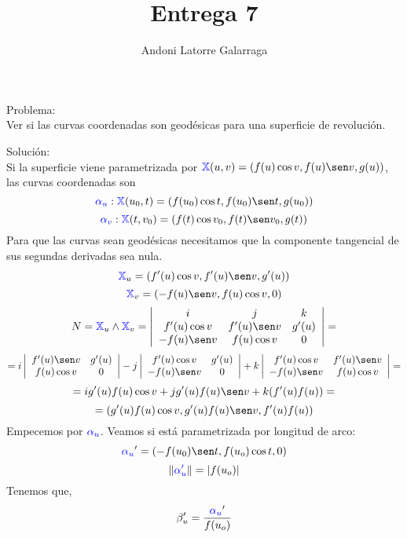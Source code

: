 \documentclass{article}
\title{Entrega 7}
\author{Andoni Latorre Galarraga}
\date{}
\newcommand{\bb}[1]{\mathbb{#1}}
\begin{document}
\maketitle

\textcolor{WildStrawberry}{Problema:}\\
Ver si las curvas coordenadas son geodésicas para una superficie de revolución.

\textcolor{WildStrawberry}{Solución:}\\
Si la superficie viene parametrizada por $\textcolor{blue}{\bb{X}}(u,v)=(f(u)\cos v, f(u)\sen v, g(u))$, las curvas coordenadas son
$$
\textcolor{blue}{\alpha_u} : \textcolor{blue}{\bb{X}}(u_0, t) = (f(u_0)\cos t, f(u_0)\sen t, g(u_0))
$$
$$
\textcolor{blue}{\alpha_v} : \textcolor{blue}{\bb{X}}(t, v_0) = (f(t)\cos v_0, f(t)\sen v_0, g(t))
$$
Para que las curvas sean geodésicas necesitamos que la componente tangencial de sus segundas derivadas sea nula.
$$
\textcolor{blue}{\bb{X}}_u = (f'(u) \cos v, f'(u) \sen v, g'(u))
$$
$$
\textcolor{blue}{\bb{X}}_v = (-f(u)\sen v, f(u)\cos v, 0)
$$
$$
N = \textcolor{blue}{\bb{X}}_u \land \textcolor{blue}{\bb{X}}_v =
\left|\begin{array}{ccc}
    i & j & k \\
    f'(u) \cos v & f'(u) \sen v & g'(u) \\
    -f(u)\sen v & f(u)\cos v & 0
\end{array}\right|=
$$
$$
=i
\left|\begin{array}{cc}
    f'(u)\sen v & g'(u) \\
    f(u)\cos v & 0 \\
\end{array}\right|
- j
\left|\begin{array}{cc}
    f'(u)\cos v & g'(u) \\
    -f(u)\sen v & 0 \\
\end{array}\right|
+ k
\left|\begin{array}{cc}
    f'(u)\cos v & f'(u)\sen v \\
    -f(u)\sen v & f(u)\cos v \\
\end{array}\right| =
$$
$$
=i g'(u)f(u)\cos v + j g'(u)f(u)\sen v + k (f'(u)f(u))=
$$
$$
=(g'(u)f(u) \cos v, g'(u)f(u)\sen v, f'(u)f(u))
$$
Empecemos por $\textcolor{blue}{\alpha_u}$. Veamos si está parametrizada por longitud de arco:
$$
\textcolor{blue}{\alpha_u}' = (-f(u_0) \sen t, f(u_o) \cos t, 0)
$$
$$
\| \textcolor{blue}{\alpha_u'} \| = |f(u_o)|
$$
Tenemos que,
$$
\beta_u' = \frac{\textcolor{blue}{\alpha_u}'}{f(u_o)}
$$
\end{document}
